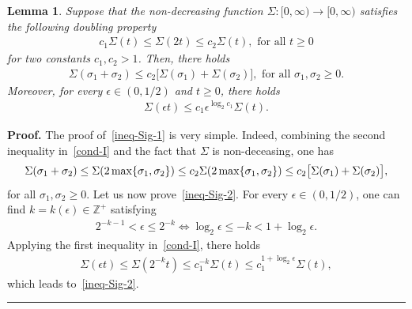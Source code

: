 \documentclass[a4paper, 11pt]{article}
\newtheorem{lemma}[theorem]{Lemma}
\newenvironment{proof}[1][Proof]{\textbf{#1.} }{\hfill\rule{0.5em}{0.5em}}
\begin{document}
\begin{lemma}\label{lem-Sig}
Suppose that the non-decreasing function $\Sigma: [0,\infty) \to [0,\infty)$  satisfies the following doubling property
\begin{align}\label{cond-I}
c_1 \Sigma(t) \le \Sigma(2t) \le c_2 \Sigma(t), \mbox{ for all } t \ge 0
\end{align}
for two constants $c_1, c_2>1$. Then, there holds
\begin{align}\label{ineq-Sig-1}
\Sigma(\sigma_1 + \sigma_2) \le c_2 \big[\Sigma(\sigma_1) + \Sigma(\sigma_2)\big], \mbox{ for all } \sigma_1, \sigma_2 \ge 0.
\end{align}
Moreover, for every $\epsilon \in (0,1/2)$ and $t \ge 0$, there holds
\begin{align}\label{ineq-Sig-2}
\Sigma(\epsilon t) \le c_1\epsilon^{\log_2 c_1} \Sigma(t).
\end{align}
\end{lemma}
\begin{proof}
The proof of~\eqref{ineq-Sig-1} is very simple. Indeed, combining the second inequality in~\eqref{cond-I} and the fact that $\Sigma$ is non-deceasing, one has
\begin{align}\notag
\Sigma(\sigma_1 + \sigma_2) \le \Sigma(2\max\{\sigma_1,\sigma_2\}) \le c_2 \Sigma(2\max\{\sigma_1,\sigma_2\}) \le c_2 \big[\Sigma(\sigma_1) + \Sigma(\sigma_2)\big], 
\end{align}
for all $\sigma_1, \sigma_2 \ge 0$. Let us now prove~\eqref{ineq-Sig-2}. For every $\epsilon \in (0,1/2)$, one can find $k = k(\epsilon) \in \mathbb{Z}^+$ satisfying
\begin{align*}
2^{-k-1} < \epsilon \le 2^{-k} \Leftrightarrow \log_2\epsilon \le -k < 1+\log_2\epsilon.
\end{align*}
Applying the first inequality in~\eqref{cond-I}, there holds
\begin{align*}
\Sigma(\epsilon t) \le \Sigma(2^{-k} t) \le c_1^{-k} \Sigma(t) \le c_1^{1+\log_2\epsilon} \Sigma(t),
\end{align*}
which leads to~\eqref{ineq-Sig-2}. 
\end{proof}
\end{document}
